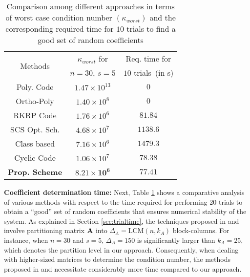 \begin{table}[t]
\caption{\small Comparison among different approaches in terms of worst case condition number $\left(\kappa_{worst} \right)$ 
and the corresponding required time for $10$ trials to find a good set of random coefficients}
\vspace{-0.1 in}
\label{table:kappa}
\begin{center}
\begin{small}
\begin{sc}
\begin{tabular}{c c c}
\hline
\toprule
\multirow{2}{*}{Methods}  & $\kappa_{worst}$ for  & Req. time for \;\\
  & $n = 30$, $s = 5$ & $10$ trials\, (in s) \\

 \midrule

\; \; Poly. Code  \cite{yu2017polynomial}   & $1.47 \times 10^{13}$ & $0$ \\
\; \; Ortho-Poly\cite{8849468}    & $1.40 \times 10^8$ & $0$ \\
\; \; RKRP Code\cite{8919859}    & $1.76 \times 10^6$ & $81.84$ \\
\; \; SCS Opt. Sch. \cite{das2020coded}   & $4.68 \times 10^7$ & $1138.6$ \\
\; \; Class based \cite{dasunifiedtreatment} & $7.16\times 10^6$ & $1479.3$ \\
\; \; Cyclic Code  \cite{das2023jsait_submitted} & $1.06 \times 10^7$ & $78.38$ \\
\; \; {\textbf{Prop. Scheme}}  & $\mathbf{{8.21 \times 10^6}}$ & $\mathbf{{77.41}}$ \\
\bottomrule
\end{tabular}
\end{sc}
\end{small}
\end{center}
\vspace{-0.2 in}
\end{table}%

\vspace{0.02 in}

{\bf Coefficient determination time:} 
Next, Table \ref{table:kappa} shows a comparative analysis of various methods with respect to the time required for performing 20 trials to obtain a ``good'' set of random coefficients that ensures numerical stability of the system. As explained in Section \ref{sec:trialtime}, the techniques proposed in \cite{das2020coded} and \cite{dasunifiedtreatment} involve partitioning matrix $\mathbf{A}$ into $\Delta_A = \textrm{LCM}(n, k_A)$ block-columns. For instance, when $n = 30$ and $s = 5$, $\Delta_A = 150$ is significantly larger than $k_A = 25$, which denotes the partition level in our approach. Consequently, when dealing with higher-sized matrices to determine the condition number, the methods proposed in \cite{das2020coded} and \cite{dasunifiedtreatment} necessitate considerably more time compared to our approach.

